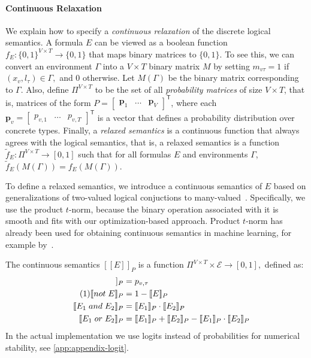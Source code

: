 \documentclass[sigplan,10pt,anonymous]{acmart} %
\newcommand{\qqpi}[2]{[\![#2]\!]_{#1}}
\newcommand\numberthis{\addtocounter{equation}{1}\tag{\theequation}}
\theoremstyle{plain}
\theoremstyle{remark}
\theoremstyle{definition}
\begin{document}
\paragraph{Continuous Relaxation}
We explain how to specify a \emph{continuous relaxation} of the discrete logical semantics.
A formula $E$ can be viewed as a boolean function $f_E: \{0, 1\}^{V \times T} \rightarrow \{0, 1\}$
that maps binary matrices to $\{0, 1\}$.
To see this, we can convert an environment
$\Gamma$ into a $V \times T$ binary matrix $M$ by setting $m_{v\tau} = 1$ if
$(x_v, l_\tau) \in \Gamma,$ and 0 otherwise.
Let $M(\Gamma)$ be the binary
matrix corresponding to $\Gamma$.
Also, define $\Pi^{V \times T}$ to be the set
of all \emph{probability matrices} of size $V \times T$,
that is, matrices of the form $P = \begin{bmatrix} \bm{p}_1 & \ldots & \bm{p}_{V} \end{bmatrix}^\mathsf{T}$,
where each $\bm{p}_v = \begin{bmatrix} p_{v,1} & \ldots & p_{v,{T}} \end{bmatrix}^\mathsf{T}$
is a vector that defines a probability distribution over concrete types.
Finally, a \emph{relaxed semantics} is a continuous function
that always agrees with the logical semantics, that is,
a relaxed semantics is a function
$\tilde{f}_{E} : \Pi^{V \times T}  \rightarrow [0, 1]$
such that for all formulas $E$ and environments $\Gamma$,
$\tilde{f}_{E}(M(\Gamma)) = f_E(M(\Gamma)).$

To define a relaxed semantics, we introduce a continuous semantics of $E$ based on generalizations of two-valued logical conjuctions
to many-valued~\cite{hajek1998}.
Specifically, we use the product $t$-norm, because the binary operation associated with it is smooth and fits with our optimization-based approach.
Product $t$-norm has already been used for obtaining continuous semantics in machine learning, for example by~\citet{rocktaschel15}.

The continuous semantics $\qqpi{P}{E}$ is a function $\Pi^{V \times T} \times \mathcal{E} \rightarrow [0, 1],$
defined as:
\begin{align*}
  \qqpi{P}{x_v \mathrel{is} l_\tau} & = p_{v,\tau}                        \\  \numberthis \label{eq:logical}
  \qqpi{P}{\mathrel{not} E}         & = 1-\qqpi{P}{E}                     \\
  \qqpi{P}{E_1 \mathrel{and} E_2}   & = \qqpi{P}{E_1} \cdot \qqpi{P}{E_2} \\
  \qqpi{P}{E_1 \mathrel{or} E_2}    & =
  \qqpi{P}{E_1} + \qqpi{P}{E_2} - \qqpi{P}{E_1}\cdot\qqpi{P}{E_2}
\end{align*}
In the actual implementation we use logits instead of probabilities
for numerical stability, see \cref{app:appendix-logit}.
\end{document}
